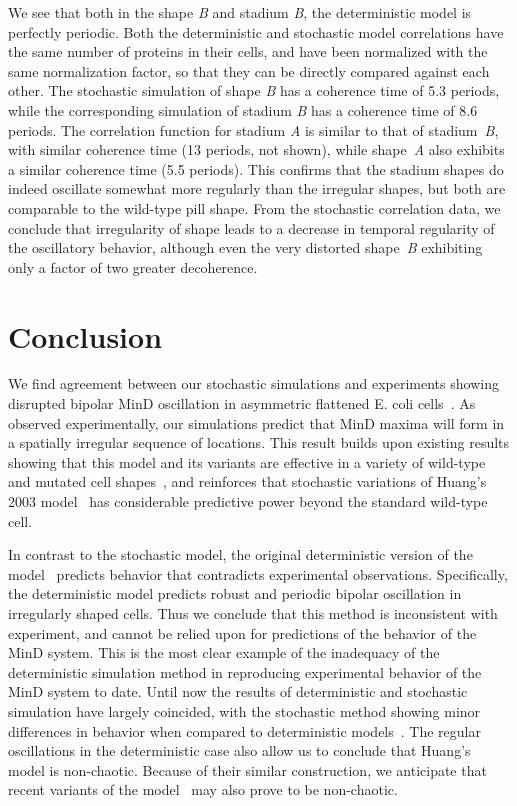\documentclass[10pt,letterpaper]{article}
\begin{document}
We see that both in the shape \emph{B} and stadium \emph{B}, the
deterministic model is perfectly periodic.  Both the deterministic and
stochastic model correlations have the same number of proteins in
their cells, and have been normalized with the same normalization
factor, so that they can be directly compared against each other.  The
stochastic simulation of shape \emph{B} has a coherence time of 5.3
periods, while the corresponding simulation of stadium \emph{B} has a
coherence time of 8.6 periods.
%
The correlation function for stadium \emph{A} is similar to that of
stadium~\emph{B}, with similar coherence time (13 periods, not shown),
while shape~\emph{A} also exhibits a similar coherence time (5.5
periods).  This confirms that the stadium shapes do indeed oscillate
somewhat more regularly than the irregular shapes, but both are
comparable to the wild-type pill shape.
%
From the stochastic correlation data, we conclude that irregularity of
shape leads to a decrease in temporal regularity of the oscillatory
behavior, although even the very distorted shape~\emph{B} exhibiting
only a factor of two greater decoherence.

\section*{Conclusion}
We find agreement between our stochastic simulations and experiments
showing disrupted bipolar MinD oscillation in asymmetric flattened
E. coli cells~\cite{mannik2012robustness}.  As observed
experimentally, our simulations predict that MinD maxima will form in
a spatially irregular sequence of locations.  This result builds upon
existing results showing that this model and its variants are
effective in a variety of wild-type and mutated cell
shapes~\cite{fange2006noise, varma2008min, kruse2007experimentalist},
and reinforces that stochastic variations of Huang's 2003
model~\cite{fange2006noise, kerr2006division} has considerable
predictive power beyond the standard wild-type cell.

In contrast to the stochastic model, the original deterministic
version of the model~\cite{huang2003dynamic} predicts behavior that
contradicts experimental observations.  Specifically, the
deterministic model predicts robust and periodic bipolar oscillation
in irregularly shaped cells.  Thus we conclude that this method is
inconsistent with experiment, and cannot be relied upon for
predictions of the behavior of the MinD system.  This is the most
clear example of the inadequacy of the deterministic simulation method
in reproducing experimental behavior of the MinD system to date.
Until now the results of deterministic and stochastic simulation have
largely coincided, with the stochastic method showing minor
differences in behavior when compared to deterministic
models~\cite{kerr2006division, fange2006noise, huang2004min,
  kruse2007experimentalist}.  The regular oscillations in the
deterministic case also allow us to conclude that Huang's model is
non-chaotic.  Because of their similar construction, we anticipate
that recent variants of the model~\cite{bonny2013membrane,
  fange2006noise, halatek2012highly} may also prove to be
non-chaotic.
\end{document}
